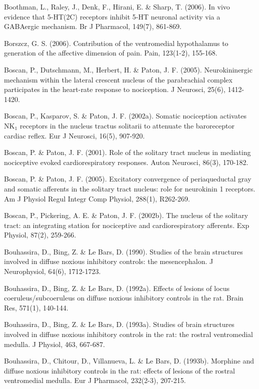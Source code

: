 \documentclass[a4paper,12pt,twoside]{report}
\begin{document}
\begin{singlespacing}
\begin{footnotesize}
Boothman, L., Raley, J., Denk, F., Hirani, E. \& Sharp, T. (2006). In vivo evidence that 5-HT(2C) receptors inhibit 5-HT neuronal activity via a GABAergic mechanism. Br J Pharmacol, 149(7), 861-869.

Borszcz, G. S. (2006). Contribution of the ventromedial hypothalamus to generation of the affective dimension of pain. Pain, 123(1-2), 155-168.

Boscan, P., Dutschmann, M., Herbert, H. \& Paton, J. F. (2005). Neurokininergic mechanism within the lateral crescent nucleus of the parabrachial complex participates in the heart-rate response to nociception. J Neurosci, 25(6), 1412-1420.

Boscan, P., Kasparov, S. \& Paton, J. F. (2002a). Somatic nociception activates NK$_{1}$ receptors in the nucleus tractus solitarii to attenuate the baroreceptor cardiac reflex. Eur J Neurosci, 16(5), 907-920.

Boscan, P. \& Paton, J. F. (2001). Role of the solitary tract nucleus in mediating nociceptive evoked cardiorespiratory responses. Auton Neurosci, 86(3), 170-182.

Boscan, P. \& Paton, J. F. (2005). Excitatory convergence of periaqueductal gray and somatic afferents in the solitary tract nucleus: role for neurokinin 1 receptors. Am J Physiol Regul Integr Comp Physiol, 288(1), R262-269.

Boscan, P., Pickering, A. E. \& Paton, J. F. (2002b). The nucleus of the solitary tract: an integrating station for nociceptive and cardiorespiratory afferents. Exp Physiol, 87(2), 259-266.

Bouhassira, D., Bing, Z. \& Le Bars, D. (1990). Studies of the brain structures involved in diffuse noxious inhibitory controls: the mesencephalon. J Neurophysiol, 64(6), 1712-1723.

Bouhassira, D., Bing, Z. \& Le Bars, D. (1992a). Effects of lesions of locus coeruleus/subcoeruleus on diffuse noxious inhibitory controls in the rat. Brain Res, 571(1), 140-144.

Bouhassira, D., Bing, Z. \& Le Bars, D. (1993a). Studies of brain structures involved in diffuse noxious inhibitory controls in the rat: the rostral ventromedial medulla. J Physiol, 463, 667-687.

Bouhassira, D., Chitour, D., Villanueva, L. \& Le Bars, D. (1993b). Morphine and diffuse noxious inhibitory controls in the rat: effects of lesions of the rostral ventromedial medulla. Eur J Pharmacol, 232(2-3), 207-215.


\end{footnotesize}
\end{singlespacing}
\end{document}
